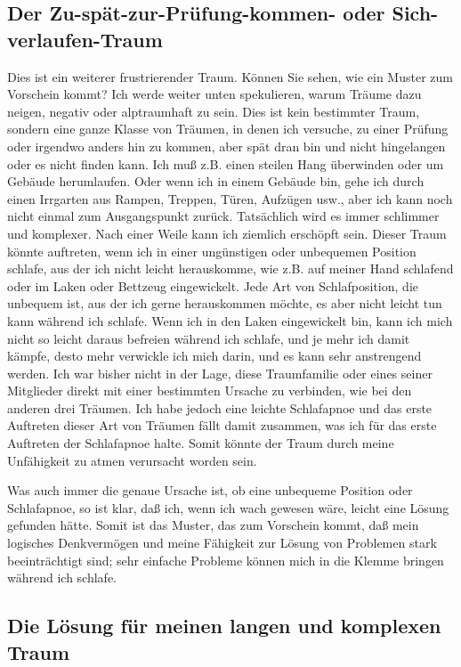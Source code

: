 \subsection{Der Zu-spät-zur-Prüfung-kommen- oder Sich-verlaufen-Traum}

Dies ist ein weiterer frustrierender Traum.
 Können Sie sehen, wie ein Muster zum Vorschein kommt?
 Ich werde weiter unten spekulieren, warum Träume dazu neigen, negativ oder alptraumhaft zu sein.
 Dies ist kein bestimmter Traum, sondern eine ganze Klasse von Träumen, in denen ich versuche, zu einer Prüfung oder irgendwo anders hin zu kommen, aber spät dran bin und nicht hingelangen oder es nicht finden kann.
 Ich muß z.B. einen steilen Hang überwinden oder um Gebäude herumlaufen.
 Oder wenn ich in einem Gebäude bin, gehe ich durch einen Irrgarten aus Rampen, Treppen, Türen, Aufzügen usw., aber ich kann noch nicht einmal zum Ausgangspunkt zurück.
 Tatsächlich wird es immer schlimmer und komplexer.
 Nach einer Weile kann ich ziemlich erschöpft sein.
 Dieser Traum könnte auftreten, wenn ich in einer ungünstigen oder unbequemen Position schlafe, aus der ich nicht leicht herauskomme, wie z.B. auf meiner Hand schlafend oder im Laken oder Bettzeug eingewickelt.
 Jede Art von Schlafposition, die unbequem ist, aus der ich gerne herauskommen möchte, es aber nicht leicht tun kann während ich schlafe.
 Wenn ich in den Laken eingewickelt bin, kann ich mich nicht so leicht daraus befreien während ich schlafe, und je mehr ich damit kämpfe, desto mehr verwickle ich mich darin, und es kann sehr anstrengend werden.
 Ich war bisher nicht in der Lage, diese Traumfamilie oder eines seiner Mitglieder direkt mit einer bestimmten Ursache zu verbinden, wie bei den anderen drei Träumen.
 Ich habe jedoch eine leichte Schlafapnoe und das erste Auftreten dieser Art von Träumen fällt damit zusammen, was ich für das erste Auftreten der Schlafapnoe halte.
 Somit könnte der Traum durch meine Unfähigkeit zu atmen verursacht worden sein.
 

Was auch immer die genaue Ursache ist, ob eine unbequeme Position oder Schlafapnoe, so ist klar, daß ich, wenn ich wach gewesen wäre, leicht eine Lösung gefunden hätte.
 Somit ist das Muster, das zum Vorschein kommt, daß mein logisches Denkvermögen und meine Fähigkeit zur Lösung von Problemen stark beeinträchtigt sind; sehr einfache Probleme können mich in die Klemme bringen während ich schlafe.
 \hypertarget{c3_5e}{}

\subsection{Die Lösung für meinen langen und komplexen Traum}

